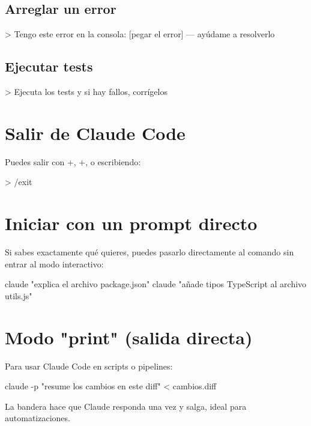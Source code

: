 \documentclass[11pt,a4paper]{report}
\DeclareRobustCommand{\texttt}[1]{{\ttfamily\seqsplit{#1}}}
\begin{document}
\subsection{Arreglar un error}

\begin{codebox}
> Tengo este error en la consola: [pegar el error] — ayúdame a resolverlo
\end{codebox}

\subsection{Ejecutar tests}

\begin{codebox}
> Ejecuta los tests y si hay fallos, corrígelos
\end{codebox}

\section{Salir de Claude Code}

Puedes salir con \texttt{Ctrl}+\texttt{C}, \texttt{Ctrl}+\texttt{D}, o escribiendo:

\begin{codebox}
> /exit
\end{codebox}

\section{Iniciar con un prompt directo}

Si sabes exactamente qué quieres, puedes pasarlo directamente al comando sin entrar al modo interactivo:

\begin{codebox}
claude "explica el archivo package.json"
claude "añade tipos TypeScript al archivo utils.js"
\end{codebox}

\section{Modo "print" (salida directa)}

Para usar Claude Code en scripts o pipelines:

\begin{codebox}
claude -p "resume los cambios en este diff" < cambios.diff
\end{codebox}

La bandera \texttt{-p} hace que Claude responda una vez y salga, ideal para automatizaciones.
\end{document}
